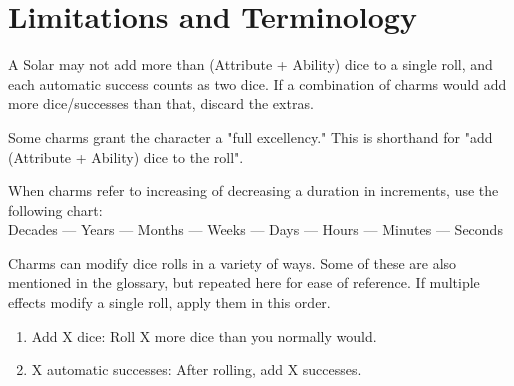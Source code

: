 \documentclass[oneside]{book}
\begin{document}
\section*{Limitations and Terminology}
\begin{multicols}{2}
\par A Solar may not add more than (Attribute + Ability) dice to a single roll, and each automatic success counts as two dice. If a combination of charms would add more dice/successes than that, discard the extras.
\par Some charms grant the character a "full excellency." This is shorthand for "add (Attribute + Ability) dice to the roll".

\par  When charms refer to increasing of decreasing a duration in increments, use the following chart: \\
    Decades --- Years --- Months --- Weeks --- Days --- Hours --- Minutes --- Seconds

\par Charms can modify dice rolls in a variety of ways. Some of these are also mentioned in the glossary, but repeated here for ease of reference. If multiple effects modify a single roll, apply them in this order.
  \begin{enumerate}
    \item Add X dice: Roll X more dice than you normally would.
    \item X automatic successes: After rolling, add X successes.
  \end{enumerate}


\end{multicols}
\end{document}
